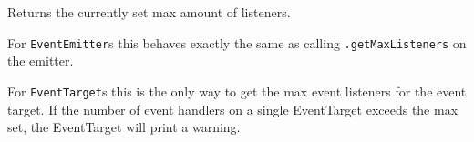 Returns the currently set max amount of listeners.

For \texttt{EventEmitter}s this behaves exactly the same as calling
\texttt{.getMaxListeners} on the emitter.

For \texttt{EventTarget}s this is the only way to get the max event
listeners for the event target. If the number of event handlers on a
single EventTarget exceeds the max set, the EventTarget will print a
warning.

\begin{Shaded}
\begin{Highlighting}[]
\OperatorTok{,}\OperatorTok{,} \NormalTok{ \} } \OperatorTok{;}

\NormalTok{\{}
  \OperatorTok{=}  \NormalTok{()}\OperatorTok{;}
  \NormalTok{(}\OperatorTok{;} 
  \NormalTok{(}\OperatorTok{,}\OperatorTok{;}
  \NormalTok{(}\OperatorTok{;} 
\NormalTok{\}}
\NormalTok{\{}
  \OperatorTok{=}  \NormalTok{()}\OperatorTok{;}
  \NormalTok{(}\OperatorTok{;} 
  \NormalTok{(}\OperatorTok{,}\OperatorTok{;}
  \NormalTok{(}\OperatorTok{;} 
\NormalTok{\}}
\end{Highlighting}
\end{Shaded}

